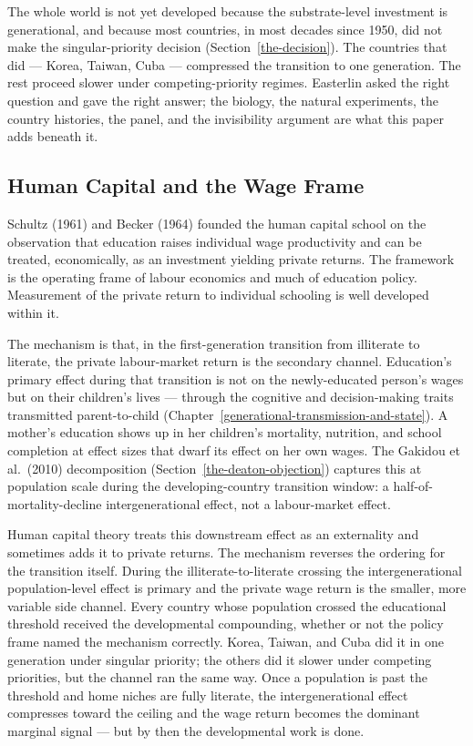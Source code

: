 \documentclass[12pt,letterpaper]{article}
\begin{document}
{The whole world is not yet developed because the substrate-level investment is generational, and because most countries, in most decades since 1950, did not make the singular-priority decision (Section~\ref{the-decision}). The countries that did --- Korea, Taiwan, Cuba --- compressed the transition to one generation. The rest proceed slower under competing-priority regimes. Easterlin asked the right question and gave the right answer; the biology, the natural experiments, the country histories, the panel, and the invisibility argument are what this paper adds beneath it.

\subsection{Human Capital and the Wage Frame}\label{human-capital-and-the-wage-frame}

Schultz (1961) and Becker (1964) founded the human capital school on the observation that education raises individual wage productivity and can be treated, economically, as an investment yielding private returns. The framework is the operating frame of labour economics and much of education policy. Measurement of the private return to individual schooling is well developed within it.

The mechanism is that, in the first-generation transition from illiterate to literate, the private labour-market return is the secondary channel. Education's primary effect during that transition is not on the newly-educated person's wages but on their children's lives --- through the cognitive and decision-making traits transmitted parent-to-child (Chapter~\ref{generational-transmission-and-state}). A mother's education shows up in her children's mortality, nutrition, and school completion at effect sizes that dwarf its effect on her own wages. The Gakidou et al.\ (2010) decomposition (Section~\ref{the-deaton-objection}) captures this at population scale during the developing-country transition window: a half-of-mortality-decline intergenerational effect, not a labour-market effect.

Human capital theory treats this downstream effect as an externality and sometimes adds it to private returns. The mechanism reverses the ordering for the transition itself. During the illiterate-to-literate crossing the intergenerational population-level effect is primary and the private wage return is the smaller, more variable side channel. Every country whose population crossed the educational threshold received the developmental compounding, whether or not the policy frame named the mechanism correctly. Korea, Taiwan, and Cuba did it in one generation under singular priority; the others did it slower under competing priorities, but the channel ran the same way. Once a population is past the threshold and home niches are fully literate, the intergenerational effect compresses toward the ceiling and the wage return becomes the dominant marginal signal --- but by then the developmental work is done.

}
\end{document}
